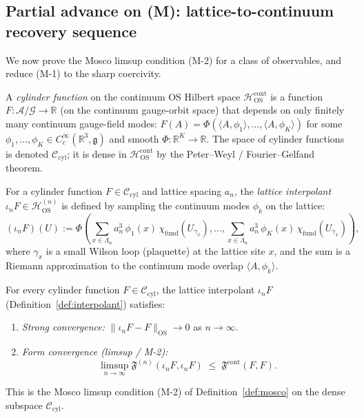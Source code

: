 \subsection{Partial advance on (M): lattice-to-continuum recovery
sequence}
\label{ssec:m_advance}

We now prove the Mosco limsup condition (M-2) for a class of
observables, and reduce (M-1) to the sharp coercivity.

\begin{definition}
\label{def:cylinder}
A \emph{cylinder function} on the continuum OS Hilbert space
$\mathcal{H}_{\mathrm{OS}}^{\mathrm{cont}}$ is a function
$F:\mathcal{A}/\mathcal{G}\to\mathbb{R}$ (on the continuum
gauge-orbit space) that depends on only finitely many continuum
gauge-field modes:
$F(A)=\Phi(\langle A,\phi_{1}\rangle,\ldots,
\langle A,\phi_{K}\rangle)$ for some
$\phi_{1},\ldots,\phi_{K}\in C^{\infty}_{c}(\mathbb{R}^{3},
\mathfrak{g})$ and smooth
$\Phi:\mathbb{R}^{K}\to\mathbb{R}$. The space of cylinder
functions is denoted $\mathcal{C}_{\mathrm{cyl}}$; it is dense in
$\mathcal{H}_{\mathrm{OS}}^{\mathrm{cont}}$ by the
Peter--Weyl / Fourier--Gelfand theorem.
\end{definition}

\begin{definition}
\label{def:interpolant}
For a cylinder function $F\in\mathcal{C}_{\mathrm{cyl}}$ and
lattice spacing $a_{n}$, the \emph{lattice interpolant}
$\iota_{n}F\in\mathcal{H}_{\mathrm{OS}}^{(n)}$ is defined by
sampling the continuum modes $\phi_{k}$ on the lattice:
\[
  (\iota_{n}F)(U)
  :=\Phi\!\left(\sum_{x\in\Lambda_{n}}a_{n}^{3}\,
  \phi_{1}(x)\,\chi_{\mathrm{fund}}(U_{\gamma_{x}}),
  \ldots,
  \sum_{x\in\Lambda_{n}}a_{n}^{3}\,
  \phi_{K}(x)\,\chi_{\mathrm{fund}}(U_{\gamma_{x}})\right),
\]
where $\gamma_{x}$ is a small Wilson loop (plaquette) at the
lattice site $x$, and the sum is a Riemann approximation to the
continuum mode overlap $\langle A,\phi_{k}\rangle$.
\end{definition}

\begin{theorem}
\label{thm:recovery}
For every cylinder function $F\in\mathcal{C}_{\mathrm{cyl}}$, the
lattice interpolant $\iota_{n}F$ (Definition~\ref{def:interpolant})
satisfies:
\begin{enumerate}
\item \emph{Strong convergence:}
$\|\iota_{n}F-F\|_{\mathrm{OS}}\to 0$ as $n\to\infty$.
\item \emph{Form convergence (limsup / M-2):}
\[
  \limsup_{n\to\infty}
  \mathfrak{F}^{(n)}(\iota_{n}F,\iota_{n}F)
  \;\le\;\mathfrak{F}^{\mathrm{cont}}(F,F).
\]
\end{enumerate}
This is the Mosco limsup condition (M-2) of
Definition~\ref{def:mosco} on the dense subspace
$\mathcal{C}_{\mathrm{cyl}}$.
\end{theorem}

